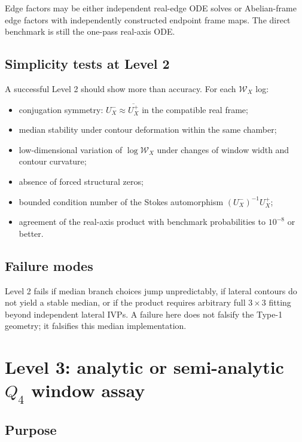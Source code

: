\documentclass[11pt]{article}
\newcommand{\calW}{\mathcal W}
\begin{document}
Edge factors may be either independent real-edge ODE solves or Abelian-frame edge factors with independently constructed endpoint frame maps. The direct benchmark is still the one-pass real-axis ODE.

\subsection{Simplicity tests at Level 2}

A successful Level 2 should show more than accuracy. For each $\calW_X$ log:
\begin{itemize}
  \item conjugation symmetry: $U_X^-\approx \overline{U_X^+}$ in the compatible real frame;
  \item median stability under contour deformation within the same chamber;
  \item low-dimensional variation of $\log \calW_X$ under changes of window width and contour curvature;
  \item absence of forced structural zeros;
  \item bounded condition number of the Stokes automorphism $(U_X^-)^{-1}U_X^+$;
  \item agreement of the real-axis product with benchmark probabilities to $10^{-8}$ or better.
\end{itemize}

\subsection{Failure modes}

Level 2 fails if median branch choices jump unpredictably, if lateral contours do not yield a stable median, or if the product requires arbitrary full $3\times3$ fitting beyond independent lateral IVPs. A failure here does not falsify the Type-1 geometry; it falsifies this median implementation.

\section{Level 3: analytic or semi-analytic $Q_4$ window assay}

\subsection{Purpose}
\end{document}
